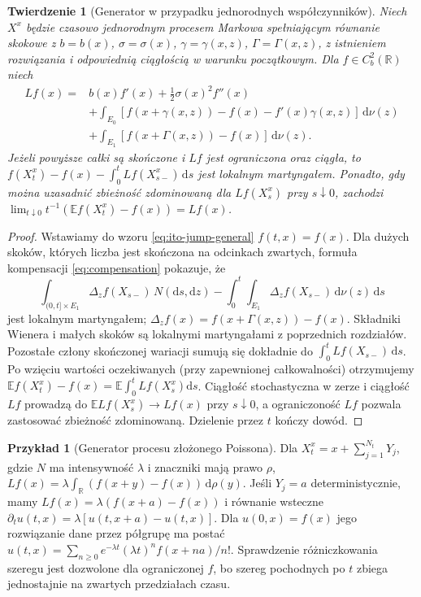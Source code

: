 \documentclass[11pt,a4paper,oneside]{report}
\numberwithin{equation}{chapter}
\theoremstyle{plain}
\newtheorem{twierdzenie}{Twierdzenie}[chapter]
\theoremstyle{definition}
\newtheorem{przyklad}{Przykład}[chapter]
\theoremstyle{remark}
\newcommand{\R}{\mathbb{R}}
\newcommand{\E}{\mathbb{E}}
\newcommand{\dd}{\mathrm{d}}
\begin{document}
\begin{twierdzenie}[Generator w przypadku jednorodnych współczynników]\label{thm:volIII:12:04}
\label{th:jump-generator}
Niech $X^x$ będzie czasowo jednorodnym procesem Markowa
spełniającym równanie skokowe
z $b=b(x)$, $\sigma=\sigma(x)$, $\gamma=\gamma(x,z)$,
$\Gamma=\Gamma(x,z)$, z istnieniem rozwiązania i
odpowiednią ciągłością w warunku początkowym.
Dla $f\in C_b^2(\R)$ niech
\[
\begin{split}
Lf(x)={}&b(x)f'(x)+\frac12\sigma(x)^2f''(x)\\
&+\int_{E_0}[f(x+\gamma(x,z))-f(x)-f'(x)\gamma(x,z)]\,\dd\nu(z)\\
&+\int_{E_1}[f(x+\Gamma(x,z))-f(x)]\,\dd\nu(z).
\end{split}
\tag{12.6}\label{eq:jump-generator}
\]
Jeżeli powyższe całki są skończone i $Lf$ jest
ograniczona oraz ciągła, to
$f(X_t^x)-f(x)-\int_0^tLf(X_{s-}^x)\,\dd s$
jest lokalnym martyngałem. Ponadto, gdy można
uzasadnić zbieżność zdominowaną dla $Lf(X_s^x)$ przy
$s\downarrow0$, zachodzi
$\lim_{t\downarrow0}t^{-1}(\E f(X_t^x)-f(x))=Lf(x)$.
\end{twierdzenie}
\begin{proof}
Wstawiamy do wzoru \eqref{eq:ito-jump-general}
$f(t,x)=f(x)$. Dla dużych skoków, których liczba jest
skończona na odcinkach zwartych, formuła kompensacji
\eqref{eq:compensation} pokazuje, że
\[
\int_{(0,t]\times E_1}\Delta_zf(X_{s-})\,N(\dd s,\dd z)
-\int_0^t\int_{E_1}\Delta_zf(X_{s-})\,\dd\nu(z)\,\dd s
\]
jest lokalnym martyngałem; $\Delta_zf(x)=f(x+\Gamma(x,z))-f(x)$.
Składniki Wienera i małych skoków są lokalnymi martyngałami
z poprzednich rozdziałów. Pozostałe człony skończonej
wariacji sumują się dokładnie do $\int_0^t Lf(X_{s-})\,\dd s$.
Po wzięciu wartości oczekiwanych (przy zapewnionej
całkowalności) otrzymujemy
$\E f(X_t^x)-f(x)=\E\int_0^tLf(X_s^x)\dd s$.
Ciągłość stochastyczna w zerze i ciągłość $Lf$ prowadzą
do $\E Lf(X_s^x)\to Lf(x)$ przy $s\downarrow0$,
a ograniczoność $Lf$ pozwala zastosować zbieżność
zdominowaną. Dzielenie przez $t$ kończy dowód.
\end{proof}

\begin{przyklad}[Generator procesu złożonego Poissona]
Dla $X_t^x=x+\sum_{j=1}^{N_t}Y_j$, gdzie
$N$ ma intensywność $\lambda$ i znaczniki mają prawo $\rho$,
$Lf(x)=\lambda\int_{\R}(f(x+y)-f(x))\,\dd\rho(y)$.
Jeśli $Y_j=a$ deterministycznie, mamy
$Lf(x)=\lambda(f(x+a)-f(x))$ i równanie wsteczne
$\partial_tu(t,x)=\lambda[u(t,x+a)-u(t,x)]$.
Dla $u(0,x)=f(x)$ jego rozwiązanie dane przez
półgrupę ma postać
$u(t,x)=\sum_{n\ge0}e^{-\lambda t}(\lambda t)^n f(x+na)/n!$.
Sprawdzenie różniczkowania szeregu jest dozwolone dla
ograniczonej $f$, bo szereg pochodnych po $t$ zbiega
jednostajnie na zwartych przedziałach czasu.
\end{przyklad}
\end{document}
